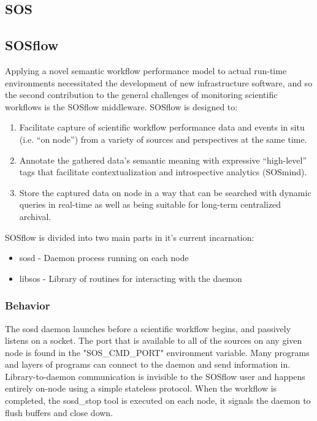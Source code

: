 
\subsection{SOS}




\subsection{SOSflow}
Applying a novel semantic workflow performance model to actual
run-time environments necessitated the development of new
infrastructure software, and so the second contribution to the general
challenges of monitoring scientific workflows is the SOSflow middleware.
SOSflow is designed to:
\begin{enumerate}
\item Facilitate capture of scientific workflow performance data and
  events in situ (i.e. ``on node'') from a variety of sources and
  perspectives at the same time.
\item Annotate the gathered data's semantic meaning with expressive
  ``high-level'' tags that facilitate contextualization and
  introspective analytics (SOSmind).
\item Store the captured data on node in a way that can be searched
  with dynamic queries in real-time as well as being suitable for
  long-term centralized archival.
\end{enumerate}
SOSflow is divided into two main parts in it's current incarnation:
\begin{itemize}
\item sosd - Daemon process running on each node
\item libsos - Library of routines for interacting with the daemon
\end{itemize}

\subsubsection{Behavior}
The sosd daemon launches before a scientific workflow begins, and
passively listens on a socket.  The port that is available to all of
the sources on any given node is found in the "SOS\_CMD\_PORT"
environment variable.  Many programs and layers of programs can
connect to the daemon and send information in. Library-to-daemon
communication is invisible to the SOSflow user and happens entirely
on-node using a simple stateless protocol.  When the workflow is
completed, the sosd\_stop tool is executed on each node, it signals
the daemon to flush buffers and close down.



